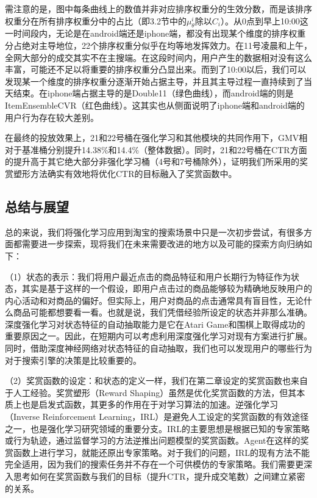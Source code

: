 需注意的是，图中每条曲线上的数值并非对应排序权重分的生效分数，而是该排序权重分在所有排序权重分中的占比（即3.2节中的$\mu^i_{\theta}$除以$C_i$）。从0点到早上10:00这一时间段内，无论是在android端还是iphone端，都没有出现某个维度的排序权重分占绝对主导地位，22个排序权重分似乎在均等地发挥效力。在11号凌晨和上午，全网大部分的成交其实不在主搜端。在这段时间内，用户产生的数据相对没有这么丰富，可能还不足以将重要的排序权重分凸显出来。而到了10:00以后，我们可以发现某一个维度的排序权重分逐渐开始占据主导，并且其主导过程一直持续到了当天结束。在iphone端占据主导的是Double11（绿色曲线），而android端的则是ItemEnsembleCVR（红色曲线）。这其实也从侧面说明了iphone端和android端的用户行为存在较大差别。

在最终的投放效果上，21和22号桶在强化学习和其他模块的共同作用下，GMV相对于基准桶分别提升14.38\%和14.4\%（整体数据）。同时，21和22号桶在CTR方面的提升高于其它绝大部分非强化学习桶（4号和7号桶除外），证明我们所采用的奖赏塑形方法确实有效地将优化CTR的目标融入了奖赏函数中。

\subsection{总结与展望}
总的来说，我们将强化学习应用到淘宝的搜索场景中只是一次初步尝试，有很多方面都需要进一步探索，现将我们在未来需要改进的地方以及可能的探索方向归纳如下：

（1）状态的表示：我们将用户最近点击的商品特征和用户长期行为特征作为状态，其实是基于这样的一个假设，即用户点击过的商品能够较为精确地反映用户的内心活动和对商品的偏好。但实际上，用户对商品的点击通常具有盲目性，无论什么商品可能都想要看一看。也就是说，我们凭借经验所设定的状态并非那么准确。深度强化学习对状态特征的自动抽取能力是它在Atari Game和围棋上取得成功的重要原因之一。因此，在短期内可以考虑利用深度强化学习对现有方案进行扩展。同时，借助深度神经网络对状态特征的自动抽取，我们也可以发现用户的哪些行为对于搜索引擎的决策是比较重要的。

（2）奖赏函数的设定：和状态的定义一样，我们在第二章设定的奖赏函数也来自于人工经验。奖赏塑形（Reward Shaping）虽然是优化奖赏函数的方法，但其本质上也是启发式函数，其更多的作用在于对学习算法的加速。逆强化学习（Inverse Reinforcement Learning，IRL）是避免人工设定的奖赏函数的有效途径之一，也是强化学习研究领域的重要分支。IRL的主要思想是根据已知的专家策略或行为轨迹，通过监督学习的方法逆推出问题模型的奖赏函数。Agent在这样的奖赏函数上进行学习，就能还原出专家策略。对于我们的问题，IRL的现有方法不能完全适用，因为我们的搜索任务并不存在一个可供模仿的专家策略。我们需要更深入思考如何在奖赏函数与我们的目标（提升CTR，提升成交笔数）之间建立紧密的关系。

